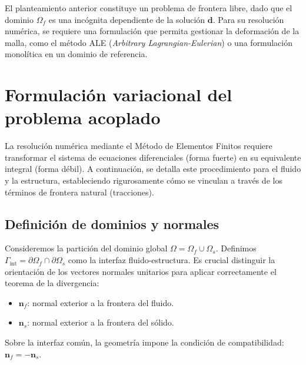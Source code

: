 \documentclass[12pt, letterpaper]{report}
\theoremstyle{definition}
\begin{document}
El planteamiento anterior constituye un problema de frontera libre, dado que el dominio $\Omega_f$ es una incógnita dependiente de la solución $\mathbf{d}$. Para su resolución numérica, se requiere una formulación que permita gestionar la deformación de la malla, como el método ALE (\textit{Arbitrary Lagrangian-Eulerian}) o una formulación monolítica en un dominio de referencia.

\section{Formulación variacional del problema acoplado}

La resolución numérica mediante el Método de Elementos Finitos requiere transformar el sistema de ecuaciones diferenciales (forma fuerte) en su equivalente integral (forma débil). A continuación, se detalla este procedimiento para el fluido y la estructura, estableciendo rigurosamente cómo se vinculan a través de los términos de frontera natural (tracciones).

\subsection{Definición de dominios y normales}
\label{subsec:dominios_normales}

Consideremos la partición del dominio global $\Omega = \Omega_f \cup \Omega_s$. Definimos $\Gamma_{\text{int}} = \partial \Omega_f \cap \partial \Omega_s$ como la interfaz fluido-estructura. Es crucial distinguir la orientación de los vectores normales unitarios para aplicar correctamente el teorema de la divergencia:
\begin{itemize}
    \item $\mathbf{n}_f$: normal exterior a la frontera del fluido.
    \item $\mathbf{n}_s$: normal exterior a la frontera del sólido.
\end{itemize}


Sobre la interfaz común, la geometría impone la condición de compatibilidad:\\ $\mathbf{n}_f = - \mathbf{n}_s$.
\end{document}
